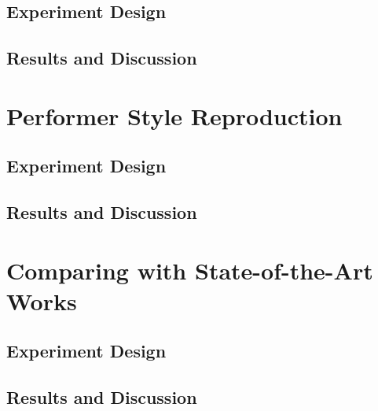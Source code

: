 \subsection{Experiment Design}

\subsection{Results and Discussion}

\section{Performer Style Reproduction}
\subsection{Experiment Design}

\subsection{Results and Discussion}
\section{Comparing with State-of-the-Art Works}
\subsection{Experiment Design}
\subsection{Results and Discussion}
